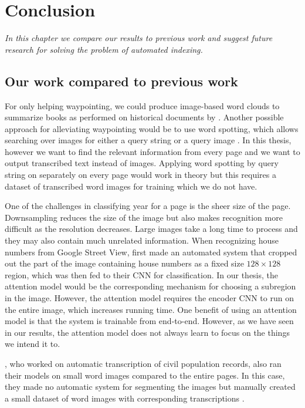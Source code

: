 \chapter{Conclusion}

\textit{In this chapter we compare our results to previous work and suggest future research for solving the problem of automated indexing.}

%


\section{Our work compared to previous work}

For only helping waypointing, we could produce image-based word clouds to summarize books as performed on historical documents by \textcite{ImageCloud}. Another possible approach for alleviating waypointing would be to use word spotting, which allows searching over images for either a query string or a query image \cite{WordSpotting}.
In this thesis, however we want to find the relevant information from every page and we want to output transcribed text instead of images. Applying word spotting by query string on separately on every page would work in theory but this requires a dataset of transcribed word images for training which we do not have.

One of the challenges in classifying year for a page is the sheer size of the page. Downsampling reduces the size of the image but also makes recognition more difficult as the resolution decreases. Large images take a long time to process and they may also contain much unrelated information. When recognizing house numbers from Google Street View, \textcite{multidigit_streetview} first made an automated system that cropped out the part of the image containing house numbers as a fixed size $128 \times 128$ region, which was then fed to their CNN for classification. In our thesis, the attention model would be the corresponding mechanism for choosing a subregion in the image. However, the attention model requires the encoder CNN to run on the entire image, which increases running time.
One benefit of using an attention model is that the system is trainable from end-to-end.
However, as we have seen in our results, the attention model does not always learn to focus on the things we intend it to.

\textcite{FornesCnnCategorization}, who worked on automatic transcription of civil population records, also ran their models on small word images compared to the entire pages. In this case, they made no automatic system for segmenting the images but manually created a small dataset of word images with corresponding transcriptions \cite{esposalles}.

